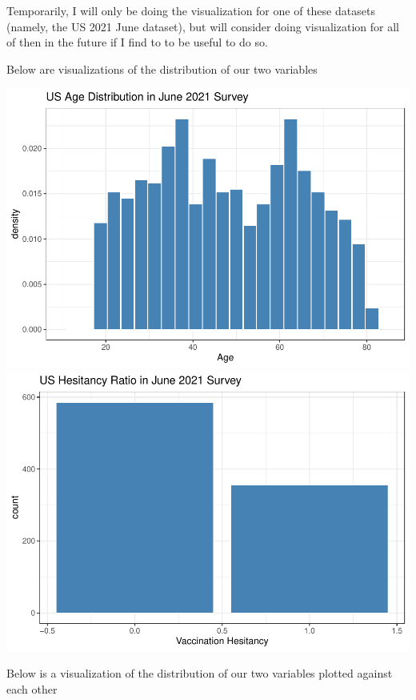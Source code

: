 \documentclass[
]{article}
\begin{document}
Temporarily, I will only be doing the visualization for one of these
datasets (namely, the US 2021 June dataset), but will consider doing
visualization for all of then in the future if I find to to be useful to
do so.

Below are visualizations of the distribution of our two variables

\includegraphics{final_project_part2_files/figure-latex/unnamed-chunk-3-1.pdf}
\includegraphics{final_project_part2_files/figure-latex/unnamed-chunk-3-2.pdf}

Below is a visualization of the distribution of our two variables
plotted against each other
\end{document}
